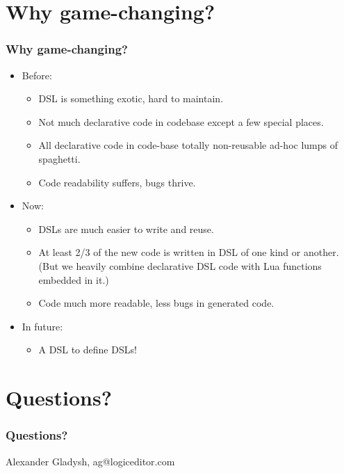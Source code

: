 \documentclass[handout]{beamer}
\begin{document}

\section{Why game-changing?}


\begin{frame}

\frametitle{Why game-changing?}

\begin{itemize}
\item Before:
  \begin{itemize}
  \item DSL is something exotic, hard to maintain.
  \item Not much declarative code in codebase except a few special places.
  \item All declarative code in code-base totally non-reusable ad-hoc lumps of spaghetti.
  \item Code readability suffers, bugs thrive.
  \end{itemize}
\pause
\item Now:
  \begin{itemize}
  \item DSLs are much easier to write and reuse.
  \item At least 2/3 of the new code is written in DSL of one kind or another.
        (But we heavily combine declarative DSL code with Lua functions embedded in it.)
  \item Code much more readable, less bugs in generated code.
  \end{itemize}
\item In future:
  \begin{itemize}
  \item A DSL to define DSLs!
  \end{itemize}
\end{itemize}

\end{frame}


\section{Questions?}


\begin{frame}

\frametitle{Questions?}

Alexander Gladysh,
ag@logiceditor.com

\end{frame}

\end{document}
